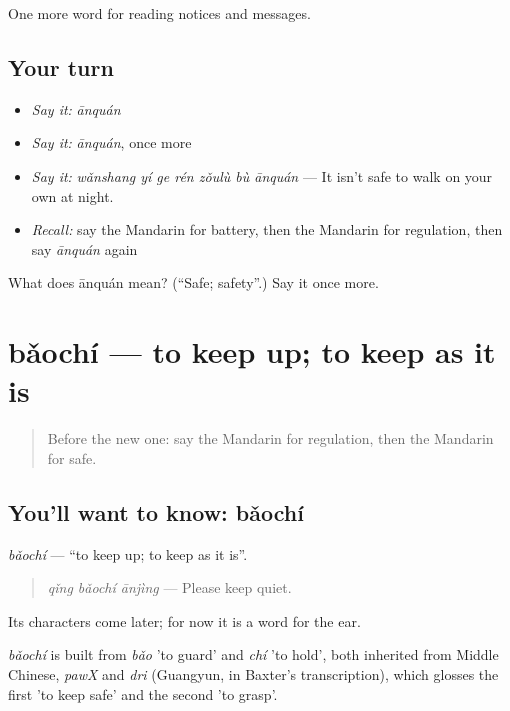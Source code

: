 \begin{grammarlens}[title={What you've built}]
One more word for reading notices and messages.
\end{grammarlens}

\subsection*{Your turn}
\begin{itemize}
\raggedright
  \item \emph{Say it:} \emph{ānquán}
  \item \emph{Say it:} \emph{ānquán}, once more
  \item \emph{Say it:} \emph{wǎnshang yí ge rén zǒulù bù ānquán} — It isn't safe to walk on your own at night.
  \item \emph{Recall:} say the Mandarin for battery, then the Mandarin for regulation, then say \emph{ānquán} again
\end{itemize}

\begin{tcolorbox}[breakable,colback=teal!4,colframe=teal!35!black,title={Before you move on}]
What does ānquán mean? (\textquotedblleft{}Safe; safety\textquotedblright{}.) Say it once more.
\end{tcolorbox}
\section[bǎochí]{bǎochí — to keep up; to keep as it is}

\label{lesson:ZH-C209-baochi}



\begin{quote}
Before the new one: say the Mandarin for regulation, then the Mandarin for safe.
\end{quote}

\subsection*{You'll want to know: bǎochí}
\emph{bǎochí} — \textquotedblleft{}to keep up; to keep as it is\textquotedblright{}.

\begin{quote}
\emph{qǐng bǎochí ānjìng} — Please keep quiet.
\end{quote}

Its characters come later; for now it is a word for the ear.

\begin{cousinweb}
\emph{bǎochí} is built from \emph{bǎo} 'to guard' and \emph{chí} 'to hold', both inherited from Middle Chinese, \emph{pawX} and \emph{dri} (Guangyun, in Baxter's transcription), which glosses the first 'to keep safe' and the second 'to grasp'.
\end{cousinweb}


